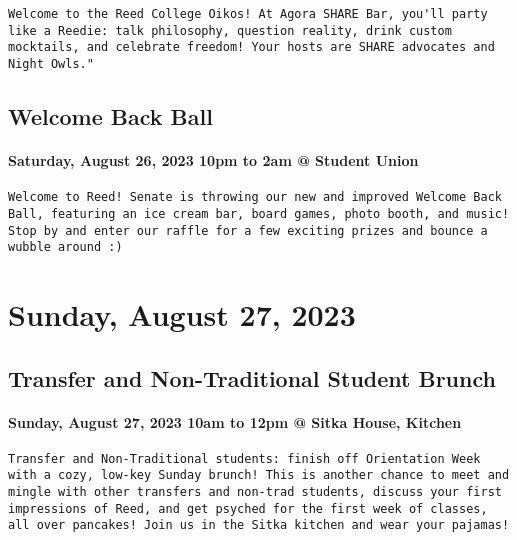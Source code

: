 \documentclass[
]{article}
\begin{document}
\begin{verbatim}
Welcome to the Reed College Oikos! At Agora SHARE Bar, you'll party like a Reedie: talk philosophy, question reality, drink custom mocktails, and celebrate freedom! Your hosts are SHARE advocates and Night Owls."
\end{verbatim}

\hypertarget{welcome-back-ball}{%
\subsection{Welcome Back Ball}\label{welcome-back-ball}}

\hypertarget{saturday-august-26-2023-10pm-to-2am-student-union}{%
\paragraph{Saturday, August 26, 2023 10pm to 2am @ Student
Union}\label{saturday-august-26-2023-10pm-to-2am-student-union}}

\begin{verbatim}
Welcome to Reed! Senate is throwing our new and improved Welcome Back Ball, featuring an ice cream bar, board games, photo booth, and music! Stop by and enter our raffle for a few exciting prizes and bounce a wubble around :)
\end{verbatim}

\hypertarget{sunday-august-27-2023}{%
\section{Sunday, August 27, 2023}\label{sunday-august-27-2023}}

\hypertarget{transfer-and-non-traditional-student-brunch}{%
\subsection{Transfer and Non-Traditional Student
Brunch}\label{transfer-and-non-traditional-student-brunch}}

\hypertarget{sunday-august-27-2023-10am-to-12pm-sitka-house-kitchen}{%
\paragraph{Sunday, August 27, 2023 10am to 12pm @ Sitka House,
Kitchen}\label{sunday-august-27-2023-10am-to-12pm-sitka-house-kitchen}}

\begin{verbatim}
Transfer and Non-Traditional students: finish off Orientation Week with a cozy, low-key Sunday brunch! This is another chance to meet and mingle with other transfers and non-trad students, discuss your first impressions of Reed, and get psyched for the first week of classes, all over pancakes! Join us in the Sitka kitchen and wear your pajamas!
\end{verbatim}
\end{document}
